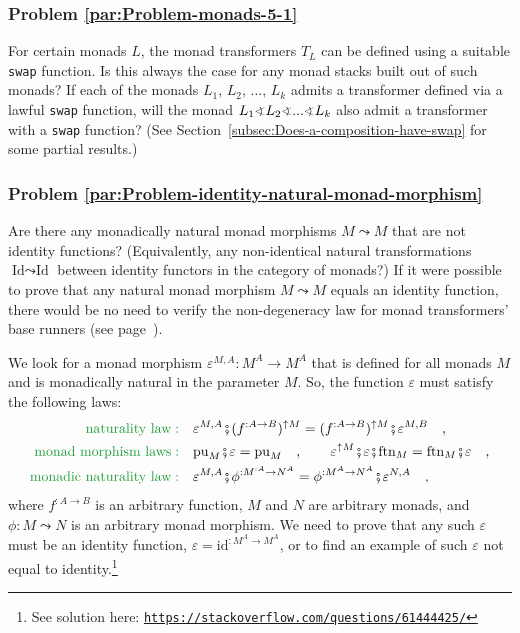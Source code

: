 \subsubsection{Problem \label{par:Problem-monads-5-1}\ref{par:Problem-monads-5-1}}

For certain monads $L$, the monad transformers $T_{L}$ can be defined
using a suitable \lstinline!swap! function. Is this always the case
for any monad stacks built out of such monads? If each of the monads
$L_{1}$, $L_{2}$, ..., $L_{k}$ admits a transformer defined via
a lawful \lstinline!swap! function, will the monad $L_{1}\varangle L_{2}\varangle...\varangle L_{k}$
also admit a transformer with a \lstinline!swap! function? (See Section~\ref{subsec:Does-a-composition-have-swap}
for some partial results.)

\subsubsection{Problem \label{par:Problem-identity-natural-monad-morphism}\ref{par:Problem-identity-natural-monad-morphism}}

Are there any monadically natural monad morphisms $M\leadsto M$ that
are not identity functions? (Equivalently, any non-identical natural
transformations $\text{Id}\leadsto\text{Id}$ between identity functors
in the category of monads?) If it were possible to prove that any
natural monad morphism $M\leadsto M$ equals an identity function,
there would be no need to verify the non-degeneracy law for monad
transformers\textsf{'} base runners (see page~\pageref{par:Open-question-monad-id-trans}).

We look for a monad morphism $\varepsilon^{M,A}:M^{A}\rightarrow M^{A}$
that is defined for all monads $M$ and is monadically natural in
the parameter $M$. So, the function $\varepsilon$ must satisfy the
following laws:
\begin{align*}
{\color{greenunder}\text{naturality law}:}\quad & \varepsilon^{M,A}\bef(f^{:A\rightarrow B})^{\uparrow M}=(f^{:A\rightarrow B})^{\uparrow M}\bef\varepsilon^{M,B}\quad,\\
{\color{greenunder}\text{monad morphism laws}:}\quad & \text{pu}_{M}\bef\varepsilon=\text{pu}_{M}\quad,\quad\quad\varepsilon^{\uparrow M}\bef\varepsilon\bef\text{ftn}_{M}=\text{ftn}_{M}\bef\varepsilon\quad,\\
{\color{greenunder}\text{monadic naturality law}:}\quad & \varepsilon^{M,A}\bef\phi^{:M^{:A}\rightarrow N^{A}}=\phi^{:M^{A}\rightarrow N^{A}}\bef\varepsilon^{N,A}\quad,
\end{align*}
where $f^{:A\rightarrow B}$ is an arbitrary function, $M$ and $N$
are arbitrary monads, and $\phi:M\leadsto N$ is an arbitrary monad
morphism. We need to prove that any such $\varepsilon$ must be an
identity function, $\varepsilon=\text{id}^{:M^{A}\rightarrow M^{A}}$,
or to find an example of such $\varepsilon$ not equal to identity.\footnote{See solution here: \texttt{\href{https://stackoverflow.com/questions/61444425/}{https://stackoverflow.com/questions/61444425/}}}

